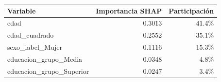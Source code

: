 \begin{tabular}{lrr}
\toprule
Variable & Importancia SHAP & Participación \\
\midrule
edad & 0.3013 & 41.4\% \\
edad\_cuadrado & 0.2552 & 35.1\% \\
sexo\_label\_Mujer & 0.1116 & 15.3\% \\
educacion\_grupo\_Media & 0.0348 & 4.8\% \\
educacion\_grupo\_Superior & 0.0247 & 3.4\% \\
\bottomrule
\end{tabular}